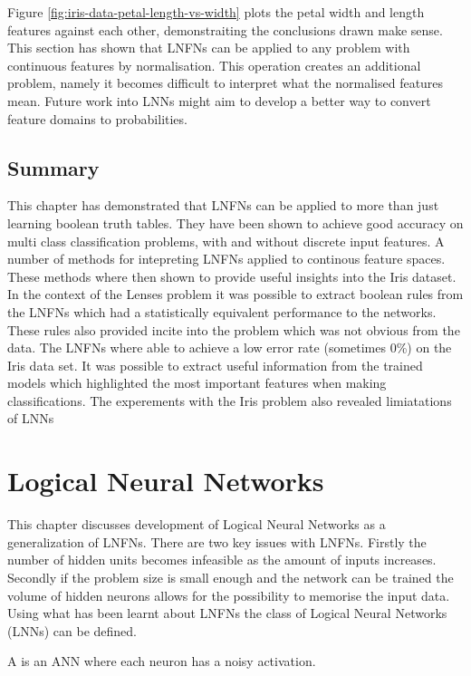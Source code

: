 Figure \ref{fig:iris-data-petal-length-vs-width} plots the petal width and length features against each other, demonstraiting the conclusions drawn make sense.\\

This section has shown that LNFNs can be applied to any problem with continuous features by normalisation. This operation creates an additional problem, namely it becomes difficult to interpret what the normalised features mean. Future work into LNNs might aim to develop a better way to convert feature domains to probabilities.

\section{Summary}
This chapter has demonstrated that LNFNs can be applied to more than just learning boolean truth tables. They have been shown to achieve good accuracy on multi class classification problems, with and without discrete input features. A number of methods for intepreting LNFNs applied to continous feature spaces. These methods where then shown to provide useful insights into the Iris dataset.\\

In the context of the Lenses problem it was possible to extract boolean rules from the LNFNs which had a statistically equivalent performance to the networks. These rules also provided incite into the problem which was not obvious from the data. The LNFNs where able to achieve a low error rate (sometimes 0\%) on the Iris data set. It was possible to extract useful information from the trained models which highlighted the most important features when making classifications. The experements with the Iris problem also revealed limiatations of LNNs

\chapter{Logical Neural Networks} \label{C:lnn}
This chapter discusses development of Logical Neural Networks as a generalization of LNFNs. There are two key issues with LNFNs. Firstly the number of hidden units becomes infeasible as the amount of inputs increases. Secondly if the problem size is small enough and the network can be trained the volume of hidden neurons allows for the possibility to memorise the input data. Using what has been learnt about LNFNs the class of Logical Neural Networks (LNNs) can be defined.

\begin{definition}
	A  is an ANN where each neuron has a noisy activation.
\end{definition}

